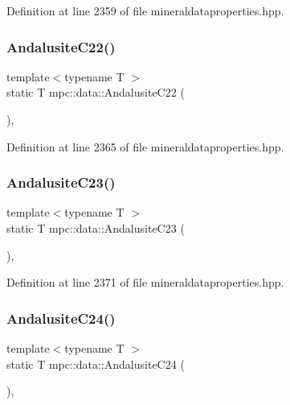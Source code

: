 Definition at line 2359 of file mineraldataproperties.\+hpp.

\mbox{\label{namespacempc_1_1data_a63b756c052707a42d89495af0eb87a4f}} 
\subsubsection{\texorpdfstring{Andalusite\+C22()}{AndalusiteC22()}}
{\footnotesize\ttfamily template$<$typename T $>$ \\
static T mpc\+::data\+::\+Andalusite\+C22 (\begin{DoxyParamCaption}{ }\end{DoxyParamCaption})\hspace{0.3cm}{\ttfamily [inline]}, {\ttfamily [static]}}



Definition at line 2365 of file mineraldataproperties.\+hpp.

\mbox{\label{namespacempc_1_1data_ac256fdd5e9fcee514f7aa3c43e8af59c}} 
\subsubsection{\texorpdfstring{Andalusite\+C23()}{AndalusiteC23()}}
{\footnotesize\ttfamily template$<$typename T $>$ \\
static T mpc\+::data\+::\+Andalusite\+C23 (\begin{DoxyParamCaption}{ }\end{DoxyParamCaption})\hspace{0.3cm}{\ttfamily [inline]}, {\ttfamily [static]}}



Definition at line 2371 of file mineraldataproperties.\+hpp.

\mbox{\label{namespacempc_1_1data_a3050b53ba8d390821883ac8418dbd1d7}} 
\subsubsection{\texorpdfstring{Andalusite\+C24()}{AndalusiteC24()}}
{\footnotesize\ttfamily template$<$typename T $>$ \\
static T mpc\+::data\+::\+Andalusite\+C24 (\begin{DoxyParamCaption}{ }\end{DoxyParamCaption})\hspace{0.3cm}{\ttfamily [inline]}, {\ttfamily [static]}}



